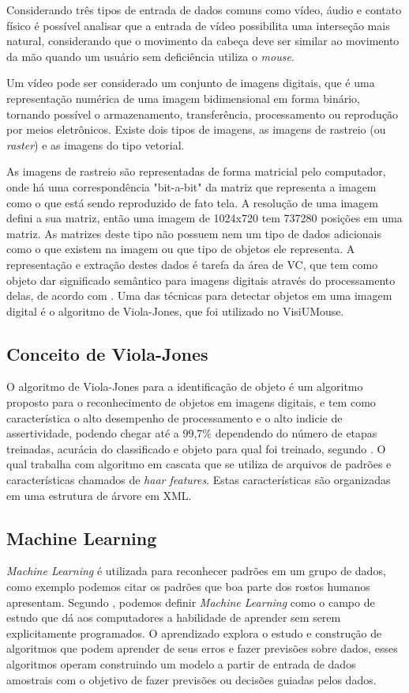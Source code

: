 Considerando três tipos de entrada de dados comuns como vídeo, áudio e contato físico é possível analisar que a entrada de vídeo possibilita uma interseção mais natural, considerando que o movimento da cabeça deve ser similar ao movimento da mão quando um usuário sem deficiência utiliza o \textit{mouse}.

Um vídeo pode ser considerado um conjunto de imagens digitais, que é uma representação numérica de uma imagem bidimensional em forma binário, tornando possível o armazenamento, transferência, processamento ou reprodução por meios eletrônicos. Existe dois tipos de imagens, as imagens de rastreio (ou \textit{raster}) e as imagens do tipo vetorial.

As imagens de rastreio são representadas de forma matricial pelo computador, onde há uma correspondência "bit-a-bit" da matriz que representa a imagem como o que está sendo reproduzido de fato tela. A resolução de uma imagem defini a sua matriz, então uma imagem de 1024x720 tem 737280 posições em uma matriz. As matrizes deste tipo não possuem nem um tipo de dados adicionais como o que existem na imagem ou que tipo de objetos ele representa. A representação e extração destes dados é tarefa da área de VC, que tem como objeto dar significado semântico para imagens digitais através do processamento delas, de acordo com . Uma das técnicas para detectar objetos em uma imagem digital é o algoritmo de Viola-Jones, que foi utilizado no VisiUMouse.

\subsection{Conceito de Viola-Jones}
O algoritmo de Viola-Jones para a identificação de objeto é um algoritmo proposto para o reconhecimento de objetos em imagens digitais, e tem como característica o alto desempenho de processamento e o alto indicie de assertividade, podendo chegar até a 99,7\% dependendo do número de etapas treinadas, acurácia do classificado e objeto para qual foi treinado, segundo . O qual trabalha com algoritmo em cascata que se utiliza de arquivos de padrões e características chamados de \textit{haar features}. Estas características são organizadas em uma estrutura de árvore em XML.

\subsection{Machine Learning}
\textit{Machine Learning} é utilizada para reconhecer padrões em um grupo de dados, como exemplo podemos citar os padrões que boa parte dos rostos humanos apresentam. Segundo , podemos definir \textit{Machine Learning} como o campo de estudo que dá aos computadores a habilidade de aprender sem serem explicitamente programados. O aprendizado explora o estudo e construção de algoritmos que podem aprender de seus erros e fazer previsões sobre dados, esses algoritmos operam construindo um modelo a partir de entrada de dados amostrais com o objetivo de fazer previsões ou decisões guiadas pelos dados.

